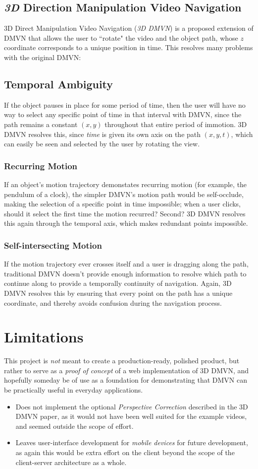 \subsection{\emph{3D} Direction Manipulation Video Navigation}
3D Direct Manipulation Video Navigation (\emph{3D DMVN}) is a proposed extension of DMVN that allows the user to ``rotate" the video and the object path, whose $z$ coordinate corresponds to a unique position in time. This resolves many problems with the original DMVN: \cite{dmvn}
\subsection {Temporal Ambiguity}
    If the object pauses in place for some period of time, then the user will have no way to select any specific point of time in that interval with DMVN, since the path remains a constant $(x,y)$ throughout that entire period of immotion. 3D DMVN resolves this, since \emph{time} is given its own axis on the path $(x,y,t)$, which can easily be seen and selected by the user by rotating the view.
\subsubsection{Recurring Motion}
    If an object's motion trajectory demonstates recurring motion (for example, the pendulum of a clock), the simpler DMVN's motion path would be self-occlude, making the selection of a specific point in time impossible; when a user clicks, should it select the first time the motion recurred? Second? 3D DMVN resolves this again through the temporal axis, which makes redundant points impossible.
\subsubsection{Self-intersecting Motion}
    If the motion trajectory ever crosses itself and a user is dragging along the path, traditional DMVN doesn't provide enough information to resolve which path to continue along to provide a temporally continuity of navigation. Again, 3D DMVN resolves this by ensuring that every point on the path has a unique coordinate, and thereby avoids confusion during the navigation process.
\section{Limitations}
This project is \emph{not} meant to create a production-ready, polished product, but rather to serve as a \emph{proof of concept} of a web implementation of 3D DMVN, and hopefully someday be of use as a foundation for demonstrating that DMVN can be practically useful in everyday applications.
\begin{itemize}
    \item Does not implement the optional \emph{Perspective Correction} described in the 3D DMVN paper, as it would not have been well suited for the example videos, and seemed outside the scope of effort.
    \item Leaves user-interface development for \emph{mobile devices} for future development, as again this would be extra effort on the client beyond the scope of the client-server architecture as a whole.
\end{itemize}

